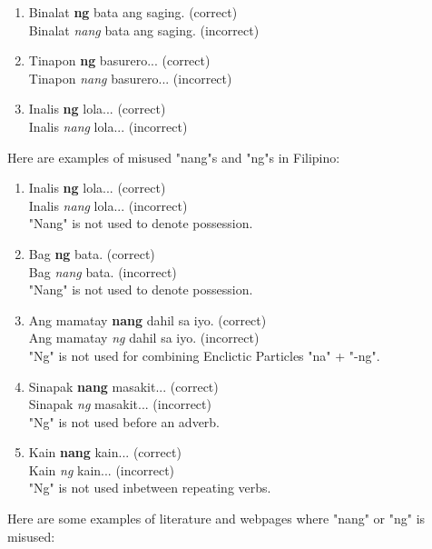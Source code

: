 \begin{enumerate}
      \item Binalat \textbf{ng} bata ang saging. (correct)
            \\ Binalat \textit{nang} bata ang saging. (incorrect)
      \item Tinapon \textbf{ng} basurero... (correct)
            \\ Tinapon \textit{nang} basurero... (incorrect)
      \item Inalis \textbf{ng} lola... (correct)
            \\ Inalis \textit{nang} lola... (incorrect)
\end{enumerate}

\begin{example}
      Here are examples of misused "nang"s and "ng"s in Filipino:
\end{example}

\begin{enumerate}
      \item Inalis \textbf{ng} lola... (correct) \\
            Inalis \textit{nang} lola... (incorrect) \\
            "Nang" is not used to denote possession.
      \item Bag \textbf{ng} bata. (correct) \\
            Bag \textit{nang} bata. (incorrect) \\
            "Nang" is not used to denote possession.
      \item Ang mamatay \textbf{nang} dahil sa iyo. (correct) \\
            Ang mamatay \textit{ng} dahil sa iyo. (incorrect) \\
            "Ng" is not used for combining Enclictic Particles "na" + "-ng".
      \item Sinapak \textbf{nang} masakit... (correct) \\
            Sinapak \textit{ng} masakit... (incorrect) \\
            "Ng" is not used before an adverb.
      \item Kain \textbf{nang} kain... (correct) \\
            Kain \textit{ng} kain... (incorrect) \\
            "Ng" is not used inbetween repeating verbs.
\end{enumerate}

\begin{example}
      Here are some examples of literature and webpages where "nang" or "ng" is
      misused:
\end{example}

